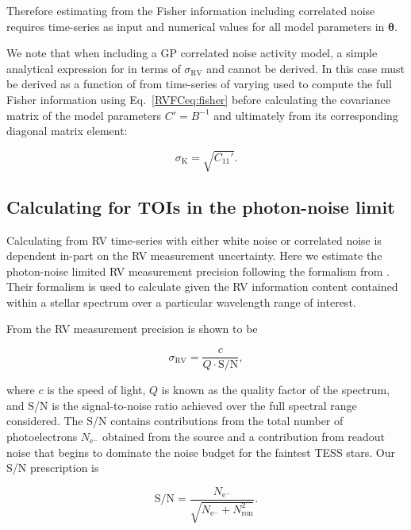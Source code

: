 \noindent Therefore estimating \sigK{} from the Fisher
information including correlated noise requires time-series as input and numerical values for all model
parameters in $\boldsymbol{\theta}$.

We note that when including a GP correlated noise activity model, a simple analytical expression
for \sigK{} in terms of $\sigma_{\text{RV}}$ and \nrv{} cannot be derived. In this case \sigK{} must be
derived as a function of \nrv{}
from time-series of varying \nrv{} used to compute the full Fisher
information using Eq.~\ref{RVFCeq:fisher} before calculating the covariance matrix of the model parameters
$C'=B^{-1}$ and ultimately \sigK{} from its corresponding diagonal matrix element:

\begin{equation}
  \sigma_{\text{K}} = \sqrt{C_{11}'}.
  \label{RVFCeq:sigKGP}
\end{equation}

\subsection{Calculating \sigRV{} for TOIs in the photon-noise limit} \label{RVFCsect:sigrv}
Calculating \sigK{} from RV time-series with either white noise or correlated noise is dependent
in-part on the RV measurement uncertainty. Here we estimate the photon-noise limited
RV measurement precision \sigRV{} following the formalism from \cite{bouchy01}. Their formalism
is used to calculate \sigRV{} given the RV information content contained within a stellar spectrum
over a particular wavelength range of interest.

From \cite{bouchy01} the RV measurement precision \sigRV{} is shown to be

\begin{equation}
  \sigma_{\text{RV}} = \frac{c}{Q \cdot \text{S/N}},
  \label{RVFCeq:sigrv}
\end{equation}

\noindent where $c$ is the speed of light, $Q$ is known as the quality factor of the spectrum,
and S/N is the signal-to-noise ratio achieved over the full spectral range considered. The
S/N contains contributions from the total number of photoelectrons $N_{\text{e}^-}$ obtained from
the source and a contribution from readout noise that begins to dominate the noise budget for the
faintest TESS stars. Our S/N prescription is

\begin{equation}
  \text{S/N} = \frac{N_{\text{e}^-}}{\sqrt{N_{\text{e}^-} + N_{\text{ron}}^2}}.
\end{equation}
  
